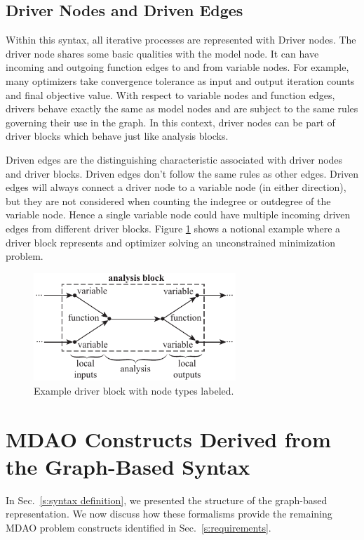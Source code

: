   \subsection{Driver Nodes and Driven Edges}
  Within this syntax, all iterative processes are represented with Driver nodes. 
  The driver node shares some basic qualities with the model node. It can have incoming 
  and outgoing function edges to and from variable nodes. For example, many optimizers take 
  convergence tolerance as input and output iteration counts and final objective value. 
  With respect to variable nodes and function edges, drivers behave exactly the same as
  model nodes and are subject to the same rules governing their use in the graph. In this
  context, driver nodes can be part of driver blocks which behave just like analysis 
  blocks. 

  Driven edges are the distinguishing characteristic associated with driver nodes and
  driver blocks. Driven edges don't follow the same rules as other edges. Driven edges  
  will always connect a driver node to a variable node (in either direction), but they 
  are not considered when counting the indegree or outdegree of the variable node.
  Hence a single variable node could have multiple incoming driven edges from different 
  driver blocks. Figure \ref{f:driver block} shows a notional example where a driver block 
  represents and optimizer solving an unconstrained minimization problem. 

  \begin{figure}[htb]
    \begin{center}
    \includegraphics[width=3.0in]{images/driver_block}
    \end{center}
    \vspace{-10pt}
  \caption{Example driver block with node types labeled.}
  \label{f:driver block}
  \end{figure}


\section{MDAO Constructs Derived from the Graph-Based Syntax}
  \label{s:graph representation}
  In Sec.~\ref{s:syntax definition}, we presented the structure of the graph-based 
  representation. We now discuss how these formalisms provide the remaining MDAO problem 
  constructs identified in Sec.~\ref{s:requirements}.


